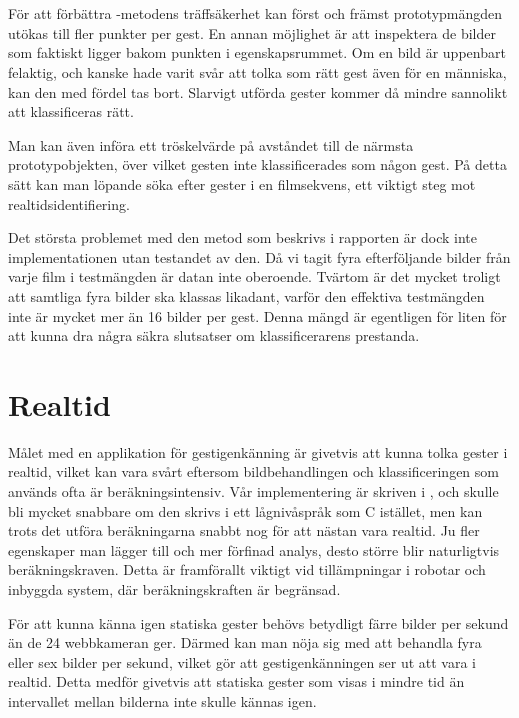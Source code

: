 \documentclass[../rapport_MVEX01-11-05]{subfiles}
\begin{document}
\section{\knn}
För att förbättra \knn-metodens träffsäkerhet kan först och
främst prototypmängden utökas till fler punkter per gest. En annan
möjlighet är att inspektera de bilder som faktiskt ligger bakom
punkten i egenskapsrummet. Om en bild är uppenbart felaktig, och kanske hade varit
svår att tolka som rätt gest även för en människa, kan den med fördel tas bort.
Slarvigt utförda gester kommer då mindre sannolikt att
klassificeras rätt.

Man kan även införa ett tröskelvärde på avståndet till de närmsta
prototypobjekten, över vilket gesten inte klassificerades som någon
gest. På detta sätt kan man löpande söka efter gester
i en filmsekvens, ett viktigt steg mot
realtidsidentifiering.

Det största problemet med den metod som beskrivs i rapporten är dock
inte implementationen utan testandet av den. Då vi tagit fyra
efterföljande bilder
från varje film i testmängden är datan inte oberoende. Tvärtom är det
mycket troligt att samtliga fyra bilder ska klassas likadant, varför
den effektiva testmängden inte är mycket mer än 16 bilder per
gest. Denna mängd är egentligen för liten för att kunna dra några
säkra slutsatser om klassificerarens prestanda.

\section{Realtid}
Målet med en applikation för gestigenkänning är givetvis att kunna tolka
gester i realtid, vilket kan vara svårt eftersom bildbehandlingen och
klassificeringen som används ofta är beräkningsintensiv. Vår implementering
är skriven i \MATLAB, och skulle bli mycket snabbare om den
skrivs i ett lågnivåspråk som C istället, men kan trots det utföra
beräkningarna snabbt nog för att nästan vara realtid.
Ju fler egenskaper man lägger till och mer förfinad analys, desto
större blir naturligtvis beräkningskraven. Detta är framförallt
viktigt vid tillämpningar i robotar och inbyggda system, där beräkningskraften
är begränsad.

För att kunna känna igen statiska gester behövs betydligt färre bilder per
sekund än de 24 webbkameran ger. Därmed kan man nöja sig med
att behandla fyra eller sex bilder per
sekund, vilket gör att gestigenkänningen ser ut att vara i realtid.
Detta medför givetvis att statiska gester som visas i mindre tid
än intervallet mellan bilderna inte skulle kännas igen.
\end{document}
